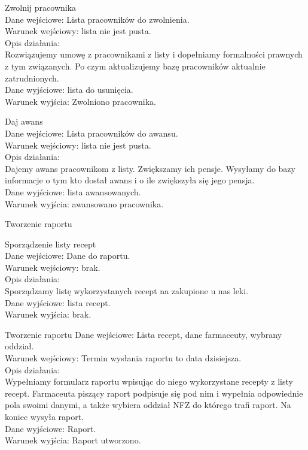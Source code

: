 \documentclass[a4paper, 11pt]{article}
\begin{document}
\begin{myEnumerate}
\begin{myEnumerate}
		\item  Zwolnij pracownika\\
	Dane wejściowe: Lista pracowników do zwolnienia.\\
	Warunek wejściowy: lista nie jest pusta.\\
	Opis działania:\\
		Rozwiązujemy umowę z pracownikami z listy i dopełniamy formalności prawnych z tym związanych. Po czym aktualizujemy bazę pracowników aktualnie zatrudnionych. \\		
	Dane wyjściowe: lista do usunięcia.\\
	Warunek wyjścia: Zwolniono pracownika.\\
		
		\item  Daj awans	\\
	Dane wejściowe: Lista pracowników do awansu.\\
	Warunek wejściowy: lista nie jest pusta.\\
	Opis działania:\\
		Dajemy awans pracownikom z listy. Zwiększamy ich pensje. Wysyłamy  do bazy informacje o tym kto dostał awans i o ile zwiększyła się jego pensja.\\

	Dane wyjściowe: lista awansowanych.\\
	Warunek wyjścia: awansowano pracownika.\\
	\end{myEnumerate}
		
	\item  Tworzenie raportu
		\begin{myEnumerate}
		\item Sporządzenie listy recept\\
		Dane wejściowe: Dane do raportu.\\
		Warunek wejściowy: brak.\\
		Opis działania:\\
		Sporządzamy listę wykorzystanych recept na zakupione u nas leki.\\
		
		Dane wyjściowe: lista recept.\\
		Warunek wyjścia: brak.
		\item  Tworzenie raportu
		Dane wejściowe: Lista recept, dane farmaceuty, wybrany oddział.\\
		Warunek wejściowy: Termin wysłania raportu to data dzisiejsza.\\
		Opis działania:\\
			Wypełniamy formularz raportu wpisując do niego wykorzystane recepty z listy recept. Farmaceuta piszący raport podpisuje się pod nim i wypełnia odpowiednie pola swoimi danymi, a także wybiera oddział NFZ do którego trafi raport. Na koniec wysyła raport.\\			
		Dane wyjściowe: Raport.\\
		Warunek wyjścia: Raport utworzono.\\
		\end{myEnumerate}
	
	\end{myEnumerate}
\end{document}
